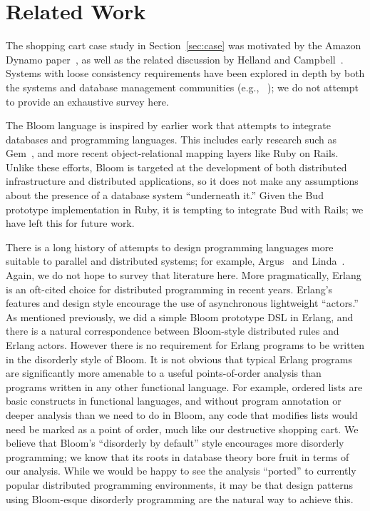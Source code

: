 \section{Related Work}
\label{sec:relwork}
The shopping cart case study in Section~\ref{sec:case} was motivated by the
Amazon Dynamo paper~\cite{dynamo}, as well as the related discussion by Helland
and Campbell~\cite{quicksand}. Systems with loose consistency requirements have
been explored in depth by both the systems and database management communities
(e.g., ~\cite{sagas,leases,gray1996dangers,bayou}); we do not attempt to provide
an exhaustive survey here.

The Bloom language is inspired by earlier work that attempts to integrate
databases and programming languages.  This includes early research such as Gem~\cite{gem}, and more recent
object-relational mapping layers like Ruby on Rails.  Unlike these efforts, Bloom is targeted at the development of both distributed infrastructure and distributed applications, so it does not make any assumptions about the presence of a database system ``underneath it.''  Given the Bud prototype implementation in Ruby, it is tempting to integrate Bud with Rails; we have left this for future work.

There is a long history of attempts to design programming languages more
suitable to parallel and distributed systems; for example, Argus~\cite{argus}
and Linda~\cite{linda}.  Again, we do not hope to survey that literature here.  More pragmatically, Erlang is an oft-cited choice for distributed programming in recent years.  Erlang's features and design style encourage the use of asynchronous lightweight ``actors.''  As mentioned previously, we did a simple Bloom prototype DSL in Erlang, and there is a natural correspondence between Bloom-style distributed rules and Erlang actors.  However there is no requirement for Erlang programs to be written in the disorderly style of Bloom. It is not obvious that typical Erlang programs are significantly more amenable to a useful points-of-order analysis than programs written in any other functional language.  For example, ordered lists are basic constructs in functional languages, and without program annotation or deeper analysis than we need to do in Bloom, any code that modifies lists would need be marked as a point of order, much like our destructive shopping cart.  We believe that Bloom's ``disorderly by default'' style encourages more disorderly programming; we know that its roots in database theory bore fruit in terms of our analysis.  While we would be happy to see the analysis ``ported'' to currently popular distributed programming environments, it may be that design patterns using Bloom-esque disorderly programming are the natural way to achieve this.
